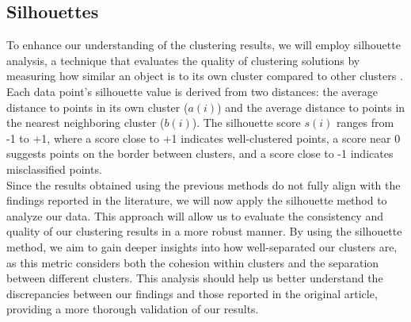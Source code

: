 \documentclass{article}
\begin{document}
\subsection{Silhouettes}
To enhance our understanding of the clustering results, we will employ silhouette analysis, a technique that evaluates the quality of clustering solutions by measuring how similar an object is to its own cluster compared to other clusters \cite{rousseeuw1987silhouettes}. Each data point's silhouette value is derived from two distances: the average distance to points in its own cluster (\(a(i)\)) and the average distance to points in the nearest neighboring cluster (\(b(i)\)). The silhouette score \(s(i)\) ranges from -1 to +1, where a score close to +1 indicates well-clustered points, a score near 0 suggests points on the border between clusters, and a score close to -1 indicates misclassified points. 
\\

Since the results obtained using the previous methods do not fully align with the findings reported in the literature, we will now apply the silhouette method to analyze our data. This approach will allow us to evaluate the consistency and quality of our clustering results in a more robust manner. By using the silhouette method, we aim to gain deeper insights into how well-separated our clusters are, as this metric considers both the cohesion within clusters and the separation between different clusters. This analysis should help us better understand the discrepancies between our findings and those reported in the original article, providing a more thorough validation of our results.
\end{document}
